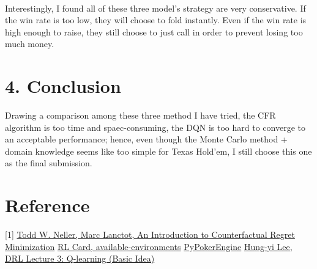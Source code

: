 \documentclass[11pt,a4paper]{article}
\begin{document}
\\
Interestingly, I found all of these three model's strategy are very conservative. If the win rate is too low, they will choose to fold instantly. Even if the win rate is
high enough to raise, they still choose to just call in order to prevent losing too much money.

\section*{4. Conclusion}
Drawing a comparison among these three method I have tried, the CFR algorithm is too time and spaec-consuming,
the DQN is too hard to converge to an acceptable performance; hence, even though
the Monte Carlo method + domain knowledge seems like too simple for Texas Hold'em, I still choose this one as the final submission.


\newpage
\section*{Reference}
[1] \href{http://modelai.gettysburg.edu/2013/cfr/cfr.pdf}{Todd W. Neller, Marc Lanctot, An Introduction to Counterfactual Regret Minimization}
\newline
[2] \href{https://rlcard.org/#available-environments}{RL Card, available-environments}
\newline
[3] \href{https://ishikota.github.io/PyPokerEngine/tutorial/participate_in_the_game/}{PyPokerEngine}
\newline
[4] \href{https://www.youtube.com/watch?v=o_g9JUMw1Oc&list=PLJV_el3uVTsODxQFgzMzPLa16h6B8kWM_&index=4&ab_channel=Hung-yiLee}{Hung-yi Lee, DRL Lecture 3: Q-learning (Basic Idea)}
\end{document}
